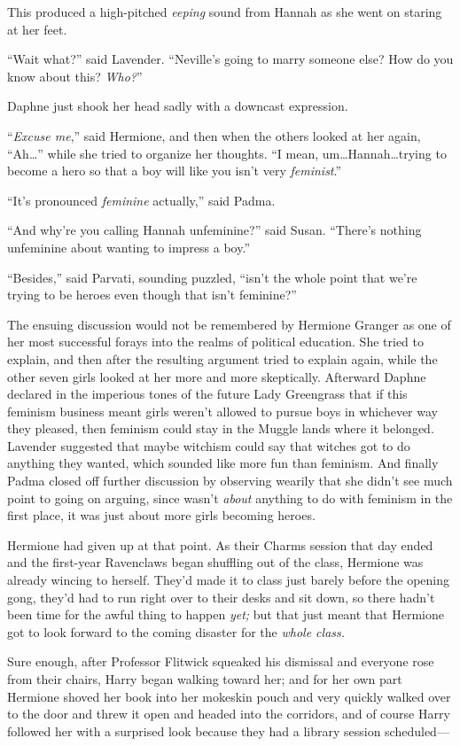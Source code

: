 This produced a high-pitched \emph{eeping} sound from Hannah as she went on
staring at her feet.

“Wait what?” said Lavender. “Neville’s going to marry someone else? How do you
know about this? \emph{Who?}”

Daphne just shook her head sadly with a downcast expression.

“\emph{Excuse me},” said Hermione, and then when the others looked at her
again, “Ah…” while she tried to organize her thoughts. “I mean,
um…Hannah…trying to become a hero so that a boy will like you
isn’t very \emph{feminist}.”

“It’s pronounced \emph{feminine} actually,” said Padma.

“And why’re you calling Hannah unfeminine?” said Susan. “There’s nothing
unfeminine about wanting to impress a boy.”

“Besides,” said Parvati, sounding puzzled, “isn’t the whole point that we’re
trying to be heroes even though that isn’t feminine?”

The ensuing discussion would not be remembered by Hermione Granger as one of
her most successful forays into the realms of political education. She tried to
explain, and then after the resulting argument tried to explain again, while
the other seven girls looked at her more and more skeptically. Afterward Daphne
declared in the imperious tones of the future Lady Greengrass that if this
feminism business meant girls weren’t allowed to pursue boys in whichever way
they pleased, then feminism could stay in the Muggle lands where it belonged.
Lavender suggested that maybe witchism could say that witches got to do
anything they wanted, which sounded like more fun than feminism. And finally
Padma closed off further discussion by observing wearily that she didn’t see
much point to going on arguing, since \SPHEW wasn’t \emph{about} anything
to do with feminism in the first place, it was just about more girls becoming
heroes.

Hermione had given up at that point.
\later
As their Charms session that day ended and the first-year Ravenclaws began
shuffling out of the class, Hermione was already wincing to herself. They’d
made it to class just barely before the opening gong, they’d had to run right
over to their desks and sit down, so there hadn’t been time for the awful thing
to happen \emph{yet;} but that just meant that Hermione got to look forward to
the coming disaster for the \emph{whole class.}

Sure enough, after Professor Flitwick squeaked his dismissal and everyone rose
from their chairs, Harry began walking toward her; and for her own part
Hermione shoved her book into her mokeskin pouch and very quickly walked over
to the door and threw it open and headed into the corridors, and of course
Harry followed her with a surprised look because they had a library session
scheduled—

